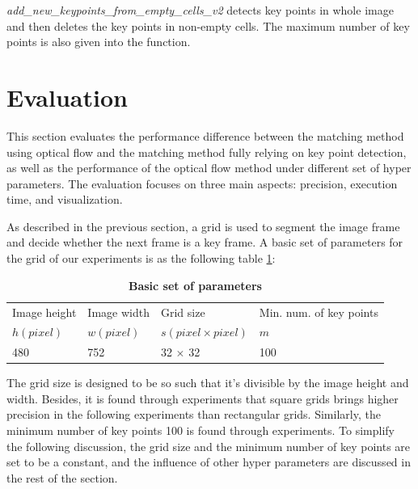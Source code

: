 \documentclass{easychair}
\begin{document}
\emph{add\_new\_keypoints\_from\_empty\_cells\_v2} detects key points in whole image and then deletes the key points in non-empty cells. The maximum number of key points is also given into the function.\\

\section{Evaluation}
This section evaluates the performance difference between the matching method using optical flow and the matching method fully relying on key point detection, as well as the performance of the optical flow method under different set of hyper parameters. The evaluation focuses on three main aspects: precision, execution time, and visualization.

As described in the previous section, a grid is used to segment the image frame and decide whether the next frame is a key frame. A basic set of parameters for the grid of our experiments is as the following table \ref{tab:basicset}:


\begin{table}[h!]
	\begin{center}
		\caption{\textbf{Basic set of parameters}}
		\label{tab:basicset}
		\begin{tabular}{llll} %
			Image height & Image width & Grid size& Min. num. of key points\\
			$h (pixel)$ & $w (pixel)$ & $s (pixel\times pixel)$ & $m$ \\
			\hline
			480 & 752 & 32 $\times$ 32 & 100 \\
			
		\end{tabular}
	\end{center}
\end{table}

The grid size is designed to be so such that it's divisible by the image height and width. Besides, it is found through experiments that square grids brings higher precision in the following experiments than rectangular grids. Similarly, the minimum number of key points 100 is found through experiments. To simplify the following discussion, the grid size and the minimum number of key points are set to be a constant, and the influence of other hyper parameters are discussed in the rest of the section.
\end{document}
